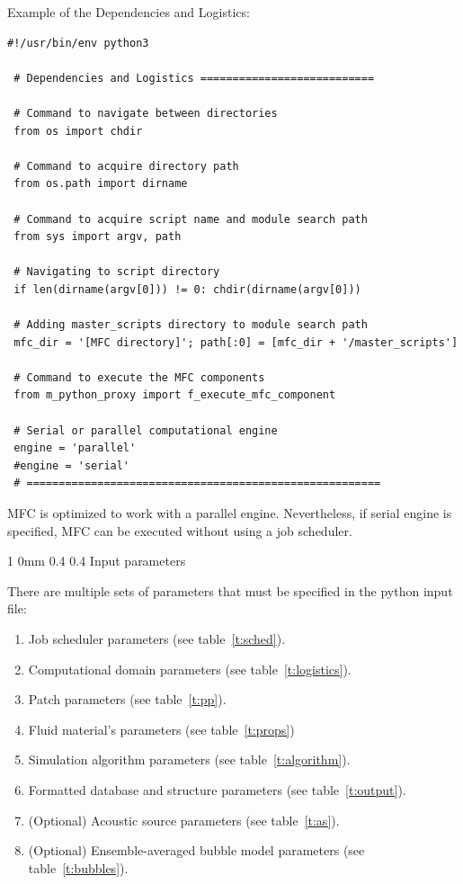 \documentclass[11pt]{article}
\makeatletter
\renewcommand{\subsection}{\@startsection
{subsection}%
{1}%
{0mm}%
{0.4\baselineskip}%
{0.4\baselineskip}%
{\normalfont\large\bfseries\color{myBrown}}}%
\makeatother
\begin{document}
Example of the Dependencies and Logistics:\\
\begin{lstlisting}[style=BashInputStyle]
 #!/usr/bin/env python3
  
 # Dependencies and Logistics ===========================

 # Command to navigate between directories
 from os import chdir

 # Command to acquire directory path
 from os.path import dirname

 # Command to acquire script name and module search path
 from sys import argv, path

 # Navigating to script directory
 if len(dirname(argv[0])) != 0: chdir(dirname(argv[0]))

 # Adding master_scripts directory to module search path
 mfc_dir = '[MFC directory]'; path[:0] = [mfc_dir + '/master_scripts']

 # Command to execute the MFC components
 from m_python_proxy import f_execute_mfc_component

 # Serial or parallel computational engine
 engine = 'parallel'
 #engine = 'serial'
 # =======================================================
\end{lstlisting}

MFC is optimized to work with a parallel engine.
Nevertheless, if serial engine is specified, MFC can be executed without using a job scheduler.

\subsection{Input parameters}

There are multiple sets of parameters that must be specified in the python input file:
\begin{enumerate}
	\item Job scheduler parameters (see table~\ref{t:sched}).
	\item Computational domain parameters (see table~\ref{t:logistics}).
	\item Patch parameters (see table~\ref{t:pp}).
	\item Fluid material's parameters (see table~\ref{t:props})
	\item Simulation algorithm parameters (see table~\ref{t:algorithm}).
	\item Formatted database and structure parameters (see table~\ref{t:output}).
    \item (Optional) Acoustic source parameters (see table~\ref{t:as}).
	\item (Optional) Ensemble-averaged bubble model parameters (see table~\ref{t:bubbles}).
\end{enumerate}
\end{document}
